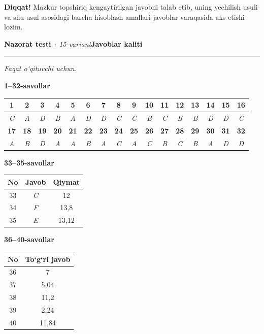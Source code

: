 \documentclass[11pt,a4paper]{article}
\newcommand{\qsep}{\par\vspace{1pt}\noindent\rule{0pt}{0.4pt}\par\vspace{5pt}}
\newcommand{\diqqat}[1]{\par\smallskip\noindent\textbf{Diqqat!} #1\par\medskip}
\begin{document}
\diqqat{Mazkur topshiriq kengaytirilgan javobni talab etib, uning yechilish usuli va shu usul asosidagi barcha hisoblash amallari javoblar varaqasida aks etishi lozim.}\qsep
\newpage
\noindent\textbf{\fontsize{13}{15}\selectfont Nazorat testi}\ \textit{$\cdot$ 15-variant}\hfill \textbf{Javoblar kaliti}\par\smallskip\hrule\smallskip
\textit{Faqat o`qituvchi uchun.}\par\medskip
\noindent\textbf{1--32-savollar}\par\smallskip
\noindent\begin{tabular}{|c|c|c|c|c|c|c|c|c|c|c|c|c|c|c|c|}\hline
\textbf{1} & \textbf{2} & \textbf{3} & \textbf{4} & \textbf{5} & \textbf{6} & \textbf{7} & \textbf{8} & \textbf{9} & \textbf{10} & \textbf{11} & \textbf{12} & \textbf{13} & \textbf{14} & \textbf{15} & \textbf{16}\\\hline
\textsl{C} & \textsl{A} & \textsl{D} & \textsl{B} & \textsl{A} & \textsl{D} & \textsl{D} & \textsl{C} & \textsl{C} & \textsl{B} & \textsl{C} & \textsl{B} & \textsl{B} & \textsl{D} & \textsl{D} & \textsl{C}\\\hline
\textbf{17} & \textbf{18} & \textbf{19} & \textbf{20} & \textbf{21} & \textbf{22} & \textbf{23} & \textbf{24} & \textbf{25} & \textbf{26} & \textbf{27} & \textbf{28} & \textbf{29} & \textbf{30} & \textbf{31} & \textbf{32}\\\hline
\textsl{A} & \textsl{B} & \textsl{D} & \textsl{A} & \textsl{A} & \textsl{B} & \textsl{A} & \textsl{C} & \textsl{A} & \textsl{C} & \textsl{B} & \textsl{C} & \textsl{B} & \textsl{A} & \textsl{D} & \textsl{D}\\\hline
\end{tabular}\par\medskip
\noindent\textbf{33--35-savollar}\par\smallskip
\noindent\begin{tabular}{|c|c|c|}\hline \textbf{No} & \textbf{Javob} & \textbf{Qiymat}\\\hline
33 & \textsl{C} & 12\\\hline
34 & \textsl{F} & 13,8\\\hline
35 & \textsl{E} & 13,12\\\hline
\end{tabular}\par\medskip
\noindent\textbf{36--40-savollar}\par\smallskip
\noindent\begin{tabular}{|c|c|}\hline \textbf{No} & \textbf{To`g`ri javob}\\\hline
36 & 7\\\hline
37 & 5,04\\\hline
38 & 11,2\\\hline
39 & 2,24\\\hline
40 & 11,84\\\hline
\end{tabular}\par\medskip
\end{document}
